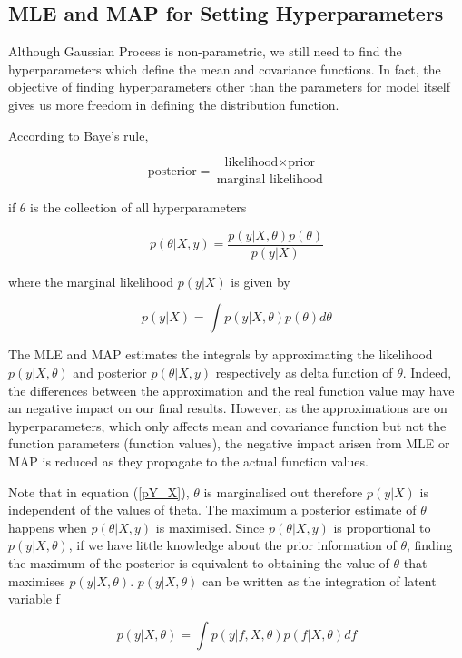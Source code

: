 \documentclass[14pt]{report}
\numberwithin{equation}{chapter}
\begin{document}
\begin{spacing}{2}
\subsection{MLE and MAP for Setting Hyperparameters}
Although Gaussian Process is non-parametric, we still need to find the hyperparameters which define the mean and covariance functions. In fact, the objective of finding hyperparameters other than the parameters for model itself gives us more freedom in defining the distribution function. 

According to Baye's rule,

\[\mbox{posterior} = \frac{\mbox{likelihood}\times \mbox{prior}}{\mbox{marginal likelihood}}\]

if $\theta$ is the collection of all hyperparameters

\[p(\theta|X,y) = \frac{p(y|X,\theta)p(\theta)}{p(y|X)}\]

where the marginal likelihood $p(y|X)$ is given by 

\begin{equation}
\label{pY_X}
p(y|X) = \int{p(y|X,\theta)p(\theta)}d\theta
\end{equation}

The MLE and MAP estimates the integrals by approximating the likelihood $p(y|X,\theta)$ and posterior $p(\theta|X,y)$ respectively as delta function of $\theta$. Indeed, the differences between the approximation and the real function value may have an negative impact on our final results. However, as the approximations are on hyperparameters, which only affects mean and covariance function but not the function parameters (function values), the negative impact arisen from MLE or MAP is reduced as they propagate to the actual function values.

Note that in equation (\ref{pY_X}), $\theta$ is marginalised out therefore $p(y|X)$ is independent of the values of theta. The maximum a posterior estimate of $\theta$ happens when $p(\theta|X,y)$ is maximised. Since $p(\theta|X,y)$ is proportional to $p(y|X,\theta)$, if we have little knowledge about the prior information of $\theta$, finding the maximum of the posterior is equivalent to obtaining the value of $\theta$ that maximises $p(y|X,\theta)$. $p(y|X,\theta)$ can be written as the integration of latent variable f

\begin{equation}
\label{theta_likelihood}
p(y|X,\theta) = \int{p(y|f,X,\theta)p(f|X,\theta)}df
\end{equation}


\end{spacing}
\end{document}

